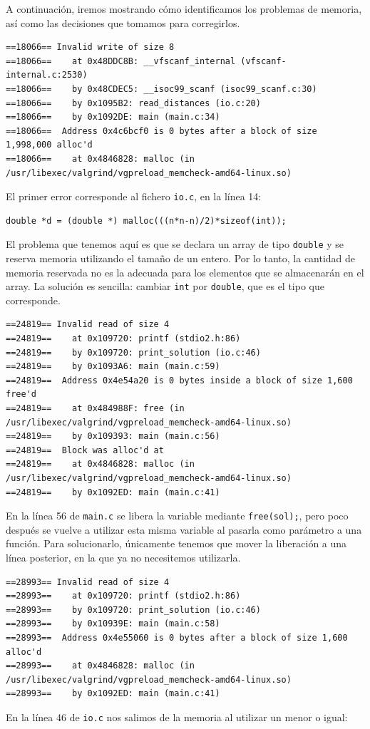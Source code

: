 \documentclass[12pt]{article}
\begin{document}
\begin{enumerate}
A continuación, iremos mostrando cómo identificamos los problemas de memoria, así como las decisiones que tomamos para corregirlos.

\begin{lstlisting}[style=EstiloValgrind]
==18066== Invalid write of size 8
==18066==    at 0x48DDC8B: __vfscanf_internal (vfscanf-internal.c:2530)
==18066==    by 0x48CDEC5: __isoc99_scanf (isoc99_scanf.c:30)
==18066==    by 0x1095B2: read_distances (io.c:20)
==18066==    by 0x1092DE: main (main.c:34)
==18066==  Address 0x4c6bcf0 is 0 bytes after a block of size 1,998,000 alloc'd
==18066==    at 0x4846828: malloc (in /usr/libexec/valgrind/vgpreload_memcheck-amd64-linux.so)
\end{lstlisting}
El primer error corresponde al fichero \texttt{io.c}, en la línea 14:

\begin{lstlisting}[style=EstiloValgrind]
double *d = (double *) malloc(((n*n-n)/2)*sizeof(int));
\end{lstlisting}
El problema que tenemos aquí es que se declara un array de tipo \texttt{double} y se reserva memoria utilizando el tamaño de un entero. Por lo tanto, la cantidad de memoria reservada no es la adecuada para los elementos que se almacenarán en el array. La solución es sencilla: cambiar \texttt{int} por \texttt{double}, que es el tipo que corresponde.

\begin{lstlisting}[style=EstiloValgrind]
==24819== Invalid read of size 4
==24819==    at 0x109720: printf (stdio2.h:86)
==24819==    by 0x109720: print_solution (io.c:46)
==24819==    by 0x1093A6: main (main.c:59)
==24819==  Address 0x4e54a20 is 0 bytes inside a block of size 1,600 free'd
==24819==    at 0x484988F: free (in /usr/libexec/valgrind/vgpreload_memcheck-amd64-linux.so)
==24819==    by 0x109393: main (main.c:56)
==24819==  Block was alloc'd at
==24819==    at 0x4846828: malloc (in /usr/libexec/valgrind/vgpreload_memcheck-amd64-linux.so)
==24819==    by 0x1092ED: main (main.c:41)
\end{lstlisting}
En la línea 56 de \texttt{main.c} se libera la variable mediante \texttt{free(sol);}, pero poco después se vuelve a utilizar esta misma variable al pasarla como parámetro a una función. Para solucionarlo, únicamente tenemos que mover la liberación a una línea posterior, en la que ya no necesitemos utilizarla.

\begin{lstlisting}[style=EstiloValgrind]
==28993== Invalid read of size 4
==28993==    at 0x109720: printf (stdio2.h:86)
==28993==    by 0x109720: print_solution (io.c:46)
==28993==    by 0x10939E: main (main.c:58)
==28993==  Address 0x4e55060 is 0 bytes after a block of size 1,600 alloc'd
==28993==    at 0x4846828: malloc (in /usr/libexec/valgrind/vgpreload_memcheck-amd64-linux.so)
==28993==    by 0x1092ED: main (main.c:41)
\end{lstlisting}
En la línea 46 de \texttt{io.c} nos salimos de la memoria al utilizar un menor o igual:


\end{enumerate}
\end{document}
